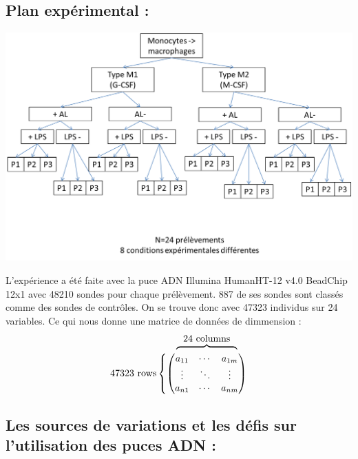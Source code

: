 \documentclass[a4paper,10pt]{article}
\begin{document}
\subsection{ Plan expérimental :}
\begin{center}
 \includegraphics[scale=0.5]{./image/plan.png}
\end{center}
L’expérience a été faite avec la puce ADN  Illumina HumanHT-12 v4.0 BeadChip 12x1 avec 48210 sondes pour chaque prélèvement.
887 de ses sondes sont classés comme des sondes de contrôles.
On se trouve donc avec 47323 individus sur 24 variables. 
Ce qui nous donne une matrice de données de dimmension :
\def\tmp{
  \begin{pmatrix}
  a_{11} & \cdots & a_{1m} \\

   \vdots & \ddots &\vdots \\

   a_{n1} & \cdots & a_{nm} 
 \end{pmatrix}
}
\[
\stackMath\def\stackalignment{r}
  \stackon
    {\mathrm{47323~rows}\left\{\tmp\right.}
    {\overbrace{\phantom{\smash{\tmp\mkern -36mu}}}^{\mathrm{\textstyle 24~columns}}\mkern 20mu}
\]

\subsection{Les sources de variations et les défis sur l'utilisation des puces ADN :}
\end{document}
